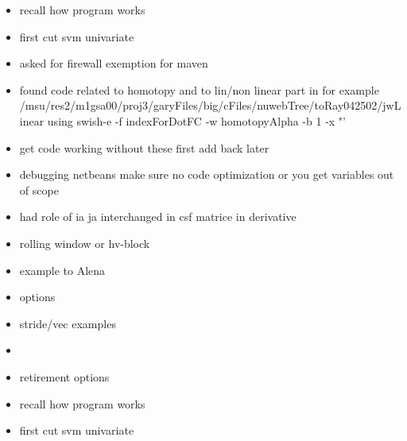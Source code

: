 \documentclass[hyperref]{labbook}
\begin{document}
\begin{itemize}
\item recall how program works
\item first cut svm univariate
\end{itemize}


\begin{itemize}
\item asked for firewall exemption for maven
\end{itemize}



\begin{itemize}
\item found code related to homotopy and to lin/non linear part in for example   /msu/res2/m1gsa00/proj3/garyFiles/big/cFiles/nuwebTree/toRay042502/jwLinear using swish-e  -f indexForDotFC -w homotopyAlpha -b 1 -x "'%
\item get code working without these first add back later
\item debugging netbeans make sure no code optimization or you get variables out of scope
\item had role of ia ja interchanged in csf matrice in derivative
\end{itemize}


\begin{itemize}
\item rolling window or hv-block
\item example to Alena
\end{itemize}


\begin{itemize}
\item options
\item stride/vec examples
\item 
\end{itemize}

\begin{itemize}
\item retirement options
\end{itemize}

\begin{itemize}
\item recall how program works
\item first cut svm univariate
\end{itemize}
\end{document}
